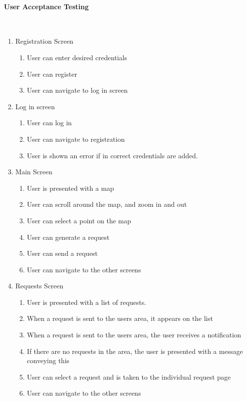 \documentclass[a4paper]{article}
\newcommand{\subsubsubsection}[1]{\paragraph{#1}\mbox{}\\}
\begin{document}
\subsubsubsection{User Acceptance Testing}
\begin{enumerate}


\item Registration Screen

  \begin{enumerate}
    \item User can enter desired credentials
    \item User can register
    \item User can navigate to log in screen
  \end{enumerate}
    
    \item Log in screen
  
    \begin{enumerate}
  \item User can log in
    \item User can navigate to registration
    \item User is shown an error if in correct credentials are added.

  \end{enumerate}


\item Main Screen
  
    \begin{enumerate}
  \item User is presented with a    map
    \item User can scroll around the map, and zoom in and out
    \item User can select a point     on the map
    
     \item User can generate a      request
      \item User can send a     request
     \item User can navigate to the other screens
  \end{enumerate}
    
    \item Requests Screen
  
    
    \begin{enumerate}
  \item User is presented with a    list of requests.
    \item When a request is sent to the users area, it appears on the list
        \item When a request is sent to the users area, the user receives a notification
        \item If there are no requests in the area, the user is presented with a message conveying this
          \item User can select a request and is taken to the individual request page
              \item User can navigate to the other screens
  \end{enumerate}
    

\end{enumerate}
\end{document}
